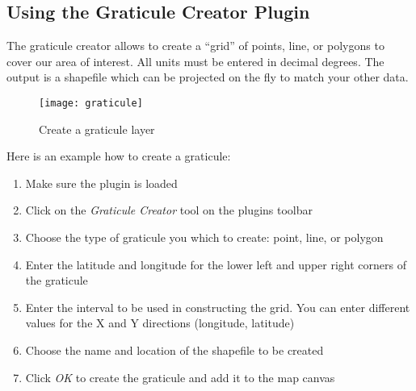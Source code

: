 \subsection{Using the Graticule Creator Plugin}

The graticule creator allows to create a ``grid'' of points, line, or
polygons to cover our area of interest. All units must be entered in
decimal degrees. The output is a shapefile which can be projected on the
fly to match your other data.

\begin{figure}[ht]
\begin{center}
  \caption{Create a graticule layer}\label{fig:graticule}\smallskip
  \texttt{[image: graticule]}
\end{center}
\end{figure}

Here is an example how to create a graticule:

\begin{enumerate}
\item Make sure the plugin is loaded
\item Click on the \textsl{Graticule Creator} tool on the plugins toolbar
\item Choose the type of graticule you which to create: point, line, or
  polygon
\item Enter the latitude and longitude for the lower left and upper right
  corners of the graticule
\item Enter the interval to be used in constructing the grid. You can
  enter different values for the X and Y directions (longitude, latitude)
\item Choose the name and location of the shapefile to be created
\item Click \textsl{OK} to create the graticule and add it to the map
  canvas
\end{enumerate} 



